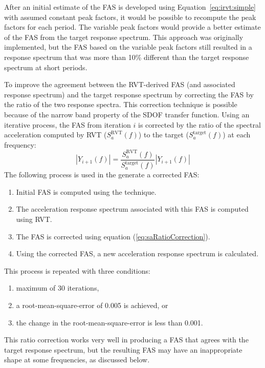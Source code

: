 \documentclass[12pt,oneside]{book}
\begin{document}
After an initial estimate of the FAS is developed using Equation~\ref{eq:irvt:simple} with assumed
constant peak factors, it would be possible to recompute the peak factors for each period.  The
variable peak factors would provide a better estimate of the FAS from the target response spectrum.
This approach was originally implemented, but the FAS based on the variable peak factors still
resulted in a response spectrum that was more than 10\% different than the target response spectrum
at short periods.

To improve the agreement between the RVT-derived FAS (and associated response spectrum) and the
target response spectrum by correcting the FAS by the ratio of the two response spectra.  This
correction technique is possible because of the narrow band property of the SDOF transfer function.
Using an iterative process, the FAS from iteration $i$ is corrected by the ratio of the spectral
acceleration computed by RVT ($S_{a}^{\text{RVT}}(f)$) to the target
($S_{a}^{\text{target}}(f)$) at each frequency:
\begin{equation}
    |Y_{i+1}(f)| = \frac{S_{a}^{\text{RVT}}(f)}{S_{a}^{\text{target}}(f)} |Y_{i+1}(f)|
    \label{eq:saRatioCorrection}
\end{equation}
The following process is used in the generate a corrected FAS:
\begin{enumerate}
    \item Initial FAS is computed using the \citet{vanmarcke:83} technique.
    \item The acceleration response spectrum associated with this FAS is computed using RVT.
    \item The FAS is corrected using equation (\ref{eq:saRatioCorrection}).
    \item Using the corrected FAS, a new acceleration response spectrum is calculated.
\end{enumerate}
This process is repeated with three conditions:
\begin{enumerate}
    \item maximum of 30 iterations,
    \item a root-mean-square-error of 0.005 is achieved, or
    \item the change in the root-mean-square-error is less than 0.001.
\end{enumerate}
This ratio correction works very well in producing a FAS that agrees with the target response
spectrum, but the resulting FAS may have an inappropriate shape at some frequencies, as discussed
below.
\end{document}
